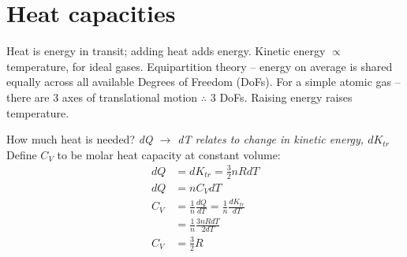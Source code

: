 \documentclass[a4paper, 11pt, normalem]{report}
\begin{document}
\section{Heat capacities}
Heat is energy in transit; adding heat adds energy.
Kinetic energy $\propto$ temperature, for ideal gases.
Equipartition theory -- energy on average is shared equally across all available Degrees of Freedom (DoFs).
For a simple atomic gas -- there are 3 axes of translational motion $\therefore$ 3 DoFs.
Raising energy raises temperature.

How much heat is needed?
\textit{dQ $\rightarrow$ dT relates to change in kinetic energy, $dK_{tr}$}
Define $C_{V}$ to be molar heat capacity at constant volume:
\begin{align}
    dQ &= dK_{tr} = \frac{3}{2}nRdT \\
    dQ &= nC_{V}dT \\
    C_{V} &= \frac{1}{n}\frac{dQ}{dT} = \frac{1}{n}\frac{dK_{tr}}{dT} \\
          &= \frac{1}{n}\frac{3nRdT}{2dT} \\
    C_{V} &= \frac{3}{2}R
\end{align}
\end{document}
